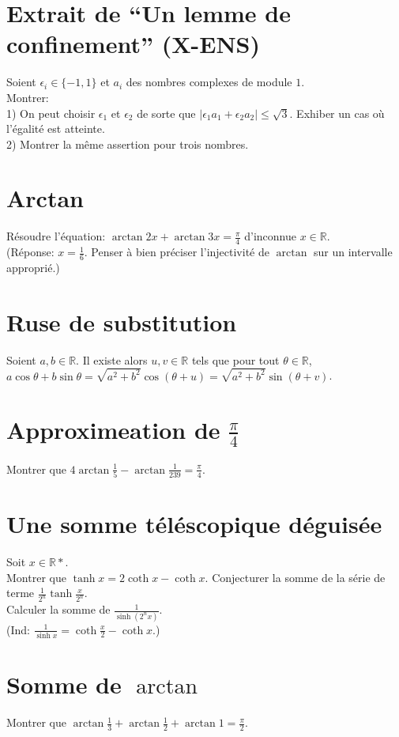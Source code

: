 \documentclass{article}
\begin{document}
\section{Extrait de ``Un lemme de confinement'' (X-ENS)}
Soient $\epsilon_{i}\in\{-1,1\}$ et $a_{i}$ des nombres complexes de module $1$.\\
Montrer:\\
1) On peut choisir $\epsilon_1$ et $\epsilon_2$ de sorte que $|\epsilon_1 a_1+\epsilon_2 a_2|\leq\sqrt{3}$. Exhiber un cas o\`u l'\'egalit\'e est atteinte.\\
2) Montrer la m\^eme assertion pour trois nombres.

\section{Arctan}
R\'esoudre l'\'equation: $\arctan{2x}+\arctan{3x}=\frac{\pi}{4}$ d'inconnue $x\in\mathbb{R}$.\\
(R\'eponse: $x=\frac{1}{6}$. Penser \`a bien pr\'eciser l'injectivit\'e de $\arctan$ sur un intervalle appropri\'e.)

\section{Ruse de substitution}
Soient $a,b\in\mathbb{R}$. Il existe alors $u,v\in\mathbb{R}$ tels que pour tout $\theta\in\mathbb{R}$,\\
$a\cos\theta+b\sin\theta=\sqrt{a^2+b^2}\cos(\theta+u)=\sqrt{a^2+b^2}\sin(\theta+v)$.

\section{Approximeation de $\frac{\pi}{4}$}
Montrer que $4\arctan\frac{1}{5}-\arctan\frac{1}{239}=\frac{\pi}{4}$.

\section{Une somme t\'el\'escopique d\'eguis\'ee}
Soit $x\in\mathbb{R*}$.\\
Montrer que $\tanh{x}=2\coth{x}-\coth{x}$. Conjecturer la somme de la s\'erie de terme $\frac{1}{2^n}\tanh\frac{x}{2^n}$.\\
Calculer la somme de $\frac{1}{\sinh(2^nx)}$.\\
(Ind: $\frac{1}{\sinh x}=\coth\frac{x}{2}-\coth x$.)

\section{Somme de $\arctan$}
Montrer que $\arctan\frac{1}{3}+\arctan\frac{1}{2}+\arctan{1}=\frac{\pi}{2}$.
\end{document}
